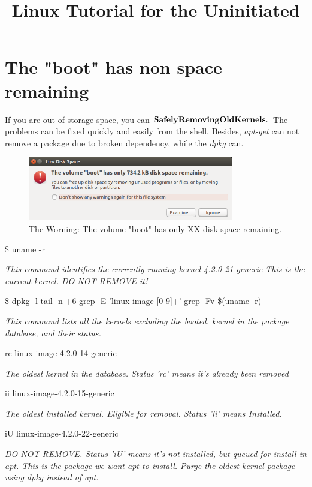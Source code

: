 \documentclass[a4paper, 12pt]{article}
\begin{document}
    \title{Linux Tutorial for the Uninitiated}
    \maketitle

    \section{The "boot" has non space remaining}

    If you are out of storage space, you can $\bf Safely Removing Old Kernels.$ The problems can be fixed quickly and 
    easily from the shell. Besides, \emph{apt-get} can not remove a package due to broken dependency, while the \emph{dpkg} can.

    \begin{figure}[h]
        \caption{The Worning: The volume "boot" has only XX disk space remaining.}
        \centering
        \includegraphics[width=0.8\textwidth]{fig1.png}
    \end{figure}


    \$ uname -r 
      
    \emph{This command identifies the currently-running kernel
    4.2.0-21-generic                   
    This is the current kernel. DO NOT REMOVE it!}

    \$ dpkg -l \text{\textbar} tail -n +6 \text{\textbar} grep -E 'linux-image-[0-9]+' \text{\textbar} grep -Fv \$(uname -r)

    \emph{This command lists all the kernels excluding the booted. kernel in the package database, and their status.}

    rc  linux-image-4.2.0-14-generic

    \emph{The oldest kernel in the database. Status 'rc' means it's already been removed}

    ii  linux-image-4.2.0-15-generic

    \emph{The oldest installed kernel. Eligible for removal. Status 'ii' means Installed.}

    iU  linux-image-4.2.0-22-generic

    \emph{DO NOT REMOVE. Status 'iU' means it's not installed, but queued for install in apt. This is the package we want apt to install. Purge the oldest kernel package using dpkg instead of apt.}
\end{document}
